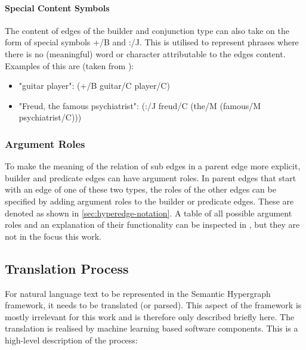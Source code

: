 \documentclass[11pt, numbers=noenddot]{scrreprt}
\let\citef\cite  %
\let\cite\parencite  %
\begin{document}
\paragraph{Special Content Symbols}
\label{sec:special-type-symbols}
The content of edges of the builder and conjunction type can also take on the form of special symbols \textsf{+/B} and \textsf{:/J}. This is utilised to represent phrases where there is no (meaningful) word or character attributable to the edges content. Examples of this are (taken from \citef[p. 7]{menezesSemanticHypergraphs2021}):

\begin{itemize}
	\item "guitar player": \textsf{(+/B guitar/C player/C)}
	\item "Freud, the famous psychiatrist": \textsf{(:/J freud/C (the/M (famous/M psychiatrist/C)))}
\end{itemize}


\subsubsection{Argument Roles}
To make the meaning of the relation of sub edges in a parent edge more explicit, builder and predicate edges can have argument roles. In parent edges that start with an edge of one of these two types, the roles of the other edges can be specified by adding argument roles to the builder or predicate edges. These are denoted as shown in \cref{sec:hyperedge-notation}.
A table of all possible argument roles and an explanation of their functionality can be inspected in \citef[p. 8]{menezesSemanticHypergraphs2021}, but they are not in the focus this work.


\subsection{Translation Process}
\label{sec:sh-translation-process}
For natural language text to be represented in the Semantic Hypergraph framework, it needs to be translated (or parsed). This aspect of the framework is mostly irrelevant for this work and is therefore only described briefly here. The translation is realised by machine learning based software components. This is a high-level description of the process: 
\end{document}
